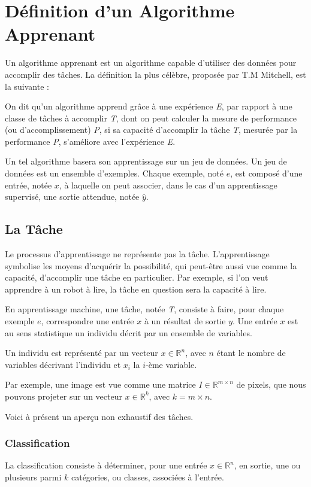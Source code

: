 \documentclass[a4paper, 10pt]{report}
\begin{document}
\section{Définition d'un Algorithme Apprenant}
Un algorithme apprenant est un algorithme capable d'utiliser des données pour accomplir des tâches. La définition la plus célèbre, proposée par T.M Mitchell, est la suivante :
\begin{displayquote}
	On dit qu'un algorithme apprend grâce à une expérience \emph{E}, par rapport à une classe de tâches à accomplir \emph{T}, dont on peut calculer la mesure de performance (ou d'accomplissement) \emph{P}, si sa capacité d'accomplir la tâche \emph{T}, mesurée par la performance \emph{P}, s'améliore avec l'expérience \emph{E}.
\end{displayquote}

Un tel algorithme basera son apprentissage sur un jeu de données. Un jeu de données est un ensemble d'exemples.
Chaque exemple, noté $e$, est composé d'une entrée, notée $x$, à laquelle on peut associer, dans le cas d'un apprentissage supervisé, une sortie attendue, notée $\hat{y}$.
\subsection{La Tâche}
Le processus d'apprentissage ne représente pas la tâche. L'apprentissage symbolise les moyens d'acquérir la possibilité, qui peut-être aussi vue comme la capacité, d'accomplir une tâche en particulier.
Par exemple, si l'on veut apprendre à un robot à lire, la tâche en question sera la capacité à lire.

En apprentissage machine, une tâche, notée \emph{T}, consiste à faire, pour chaque exemple $e$, correspondre une entrée $x$ à un résultat de sortie $y$.
Une entrée $x$ est au sens statistique un individu décrit par un ensemble de variables.
\begin{center}
	Un individu est représenté par un vecteur $x \in \mathbb{R}^n$, avec $n$ étant le nombre de variables décrivant l'individu et $x_i$ la $i$-ème variable.
\end{center}
Par exemple, une image est vue comme une matrice $I \in \mathbb{R}^{m \times n}$ de pixels, que nous pouvons projeter sur un vecteur $x \in \mathbb{R}^k$, avec $k = m \times n$.

Voici à présent un aperçu non exhaustif des tâches.
\subsubsection{Classification}
La classification consiste à déterminer, pour une entrée $x \in \mathbb{R}^n$, en sortie, une ou plusieurs parmi $k$ catégories, ou classes, associées à l'entrée.
\end{document}
